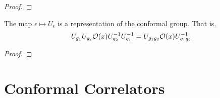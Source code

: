 \documentclass[12pt]{extarticle}
\begin{document}
\begin{proof}

\end{proof}

\begin{theorem}
The map $\epsilon \mapsto U_\epsilon$ is a representation of the conformal group. That is,
\[ U_{g_1} U_{g_2} \mathcal{O}(x) U^{-1}_{g_2} U^{-1}_{g_1} = U_{g_1 g_2} \mathcal{O}(x) U_{g_1 g_2}^{-1} \]
\end{theorem}

\begin{proof}

\end{proof}

\section{Conformal Correlators}
\end{document}
